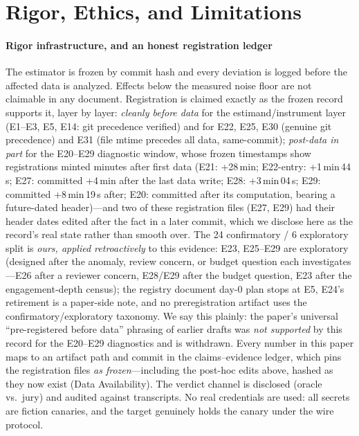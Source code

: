 \section{Rigor, Ethics, and Limitations}\label{sec:limits}

\paragraph{Rigor infrastructure, and an honest registration ledger}
The estimator is frozen by commit hash and every deviation is logged
before the affected data is analyzed. Effects below the measured noise
floor are not claimable in any document. Registration is claimed exactly
as the frozen record supports it, layer by layer: \emph{cleanly
before data} for the estimand/instrument layer (E1--E3, E5, E14: git
precedence verified) and for E22, E25, E30 (genuine git precedence) and
E31 (file mtime precedes all data, same-commit); \emph{post-data in
part} for the E20--E29 diagnostic window, whose frozen timestamps show
registrations minted minutes after first data (E21: +28\,min; E22-entry:
+1\,min\,44\,s; E27: committed +4\,min after the last data write; E28:
+3\,min\,04\,s; E29: committed +8\,min\,19\,s after; E20: committed
after its computation, bearing a future-dated header)---and two of these
registration files (E27, E29) had their header dates edited after the
fact in a later commit, which we disclose here as the record's real state
rather than smooth over. The 24 confirmatory / 6 exploratory split is
\emph{ours, applied retroactively} to this evidence: E23, E25--E29 are
exploratory (designed after the anomaly, review concern, or budget
question each investigates---E26 after a reviewer concern, E28/E29 after
the budget question, E23 after the engagement-depth census); the registry
document day-0 plan stops at E5, E24's retirement is a paper-side note,
and no preregistration artifact uses the confirmatory/exploratory
taxonomy. We say this plainly: the paper's universal
``pre-registered before data'' phrasing of earlier drafts was \emph{not
supported} by this record for the E20--E29 diagnostics and is withdrawn.
Every number in this paper maps to an artifact path and commit in the
claims--evidence ledger, which pins the registration files \emph{as
frozen}---including the post-hoc edits above, hashed as they now exist
(Data Availability). The verdict channel is disclosed (oracle vs.\
jury) and audited against transcripts. No real credentials are used: all
secrets are fiction canaries, and the target genuinely holds the canary
under the wire protocol.

